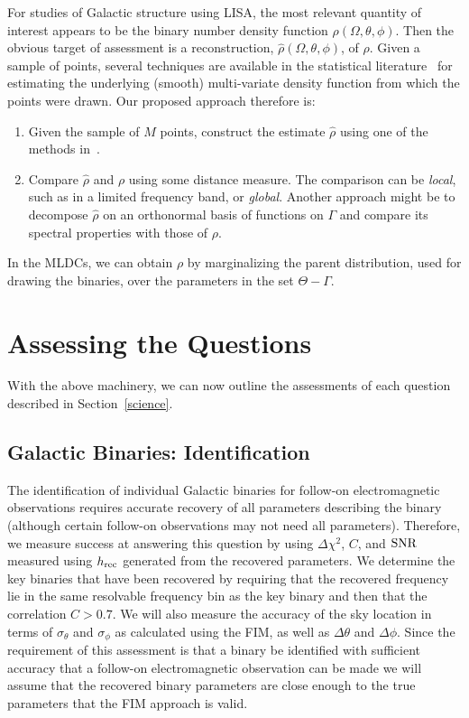 \documentclass[11pt]{article}
\begin{document}
For studies of Galactic structure using LISA, the most relevant quantity of interest appears to be the binary number density function $\rho(\Omega,\theta,\phi)$. Then the obvious target of assessment is a reconstruction, $\widehat{\rho}(\Omega,\theta,\phi)$,  of $\rho$. Given a sample of points, 
several techniques are available in the statistical literature~\cite{silverman} for estimating the underlying (smooth) multi-variate 
density function from which the points were drawn. Our proposed approach therefore is:
\begin{enumerate}
\item Given the sample of $M$ points, construct the estimate $\widehat{\rho}$ using one of the methods in~\cite{silverman}.
\item Compare $\widehat{\rho}$ and $\rho$ using some distance measure. The comparison can be {\em local}, such as in a limited frequency band, or {\em global}. Another approach might be to decompose $\widehat{\rho}$ on an orthonormal basis of functions on $\Gamma$ and 
compare its spectral properties with those of $\rho$.
\end{enumerate}
In the MLDCs, we can obtain $\rho$ by marginalizing the parent distribution, used for drawing the binaries, over the parameters in the set $\Theta - \Gamma$. 


\section{Assessing the Questions}
With the above machinery, we can now outline the assessments of each question described in Section~\ref{science}.

\subsection{Galactic Binaries: Identification}
The identification of individual Galactic binaries for follow-on electromagnetic observations requires accurate recovery of all parameters describing the binary (although certain follow-on observations may not need all parameters). Therefore, we measure success at answering this question by using $\Delta \chi^2$, $C$, and ${\rm SNR}$ measured using $h_{\rm rec}$ generated from the recovered parameters. We determine the key binaries that have been recovered by requiring that the recovered frequency lie in the same resolvable frequency bin as the key binary and then that the correlation $C > 0.7$. We will also measure the accuracy of the sky location in terms of $\sigma_{\theta}$ and $\sigma_{\phi}$ as calculated using the FIM, as well as $\Delta\theta$ and $\Delta\phi$. Since the requirement of this assessment is that a binary be identified with sufficient accuracy that a follow-on electromagnetic observation can be made we will assume that the recovered binary parameters are close enough to the true parameters that the FIM approach is valid.
\end{document}
